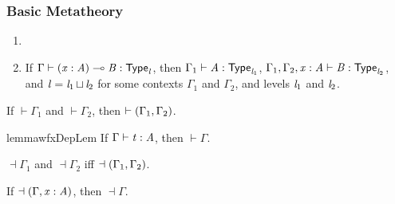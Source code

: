 \subsubsection{Basic Metatheory}
\label{subsec:basic_metatheory}

\begin{lemma}
  \label{lemma:inversion_principles}
  \begin{enumerate}[label=\roman*.]
  \item[] 
  \item If $\Gamma  \vdash  (  \mathit{x}  :  \mathit{A}  )  \multimap  \mathit{B}  :   \mathsf{Type}_{ \mathit{l} } $, then $\Gamma_{{\mathrm{1}}}  \vdash  \mathit{A}  :   \mathsf{Type}_{ \mathit{l_{{\mathrm{1}}}} } $,
    $\Gamma_{{\mathrm{1}}}  ,  \Gamma_{{\mathrm{2}}}  ,  \mathit{x}  :  \mathit{A}  \vdash  \mathit{B}  :   \mathsf{Type}_{ \mathit{l_{{\mathrm{2}}}} } $, and $\mathit{l} =  \mathit{l_{{\mathrm{1}}}}  \mathop{\sqcup}  \mathit{l_{{\mathrm{2}}}} $ for some contexts $\Gamma_{{\mathrm{1}}}$ and
    $\Gamma_{{\mathrm{2}}}$, and levels $\mathit{l_{{\mathrm{1}}}}$ and $\mathit{l_{{\mathrm{2}}}}$.
  \end{enumerate}
\end{lemma}

\begin{lemma}
  \label{lemma:well-formed_context_dependency_append}
  If $\vdash  \Gamma_{{\mathrm{1}}}$ and $\vdash  \Gamma_{{\mathrm{2}}}$, then $\vdash  (  \Gamma_{{\mathrm{1}}}  ,  \Gamma_{{\mathrm{2}}}  )$.
\end{lemma}

\begin{restatable}{lemma}{wfxDepLem}
  \label{lemma:well-formed_context_dependency}
  If $\Gamma  \vdash  \mathit{t}  :  \mathit{A}$, then $\vdash  \Gamma$.  
\end{restatable}

\begin{lemma}
  \label{lemma:well-formed_linear_contexts_append}
  $\dashv  \Gamma_{{\mathrm{1}}}$ and $\dashv  \Gamma_{{\mathrm{2}}}$ iff $\dashv  (  \Gamma_{{\mathrm{1}}}  ,  \Gamma_{{\mathrm{2}}}  )$.
\end{lemma}

\begin{lemma}
  \label{lemma:well-formed_linear_contexts_extension}
  If $\dashv  (  \Gamma  ,  \mathit{x}  :  \mathit{A}  )$, then $\dashv  \Gamma$.
\end{lemma}

